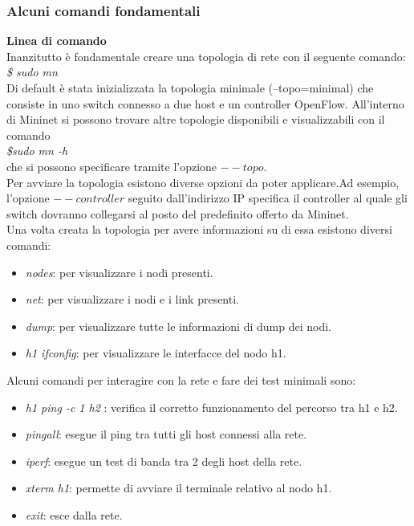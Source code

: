 \subsubsection{Alcuni comandi fondamentali}
\textbf{Linea di comando}
\\Inanzitutto è fondamentale creare una topologia di rete con il seguente comando\cite{walkmin}:
\\\textit{\$ sudo mn}
\\Di default è stata inizializzata la topologia minimale (--topo=minimal) che consiste in uno switch connesso a due host e un controller OpenFlow.
All'interno di Mininet si possono trovare altre topologie disponibili e visualizzabili con il comando \\\textit{\$sudo mn -h} \\che si possono specificare tramite l'opzione $--topo$.
\\Per avviare la topologia esistono diverse opzioni da poter applicare.Ad esempio, l'opzione $--controller$ seguito dall'indirizzo IP specifica il controller al quale gli switch dovranno collegarsi al posto 
del predefinito offerto da Mininet.
\\Una volta creata la topologia per avere informazioni su di essa esistono diversi comandi:
\begin{itemize}
    \item \textit{ nodes}: per visualizzare i nodi presenti.
    \item \textit{ net}: per visualizzare i nodi e i link presenti.
    \item \textit{ dump}: per visualizzare tutte le informazioni di dump dei nodi.
    \item \textit{h1 ifconfig}: per visualizzare le interfacce del nodo h1.
\end{itemize}
Alcuni comandi per interagire con la rete e fare dei test minimali sono:
\begin{itemize}
    \item \textit{ h1 ping -c 1 h2 }: verifica il corretto funzionamento del percorso tra h1 e h2.
    \item \textit{ pingall}: esegue il ping tra tutti gli host connessi alla rete.
    \item \textit{ iperf}: esegue un test di banda tra 2 degli host della rete.
    \item \textit{xterm h1}: permette di avviare il terminale relativo al nodo h1.
    \item \textit{exit}: esce dalla rete.
\end{itemize}
